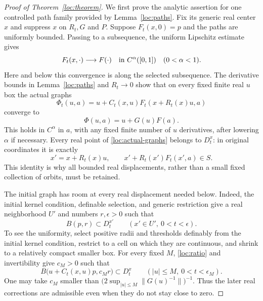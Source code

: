 \begin{proof}[Proof of Theorem~\ref{loc:theorem}]
We first prove the analytic assertion for one controlled path family
provided by Lemma~\ref{loc:paths}.  Fix its generic real center $x$ and
suppress $x$ on $R_t,G$ and $P$.  Suppose
$F_t(x,0)=p$ and the paths are uniformly bounded.  Passing to a
subsequence, the uniform Lipschitz estimate gives
\[
                  F_t(x,\cdot)\longrightarrow F(\cdot)
                        \quad\hbox{in }C^\alpha([0,1])
                        \quad(0<\alpha<1).
\]
Here and below this convergence is along the selected subsequence.
The derivative bounds in Lemma~\ref{loc:paths} and $R_t\to0$ show that
on every fixed finite real $u$ box the actual graphs
\begin{equation}\label{loc:actual-graphs}
 \Phi_t(u,a)=u+C_t(x,u)F_t(x+R_t(x)u,a)
\end{equation}
converge to
\begin{equation}\label{loc:limit-graphs}
                       \Phi(u,a)=u+G(u)F(a).
\end{equation}
This holds in $C^\alpha$ in $a$, with any fixed finite number of
$u$ derivatives, after lowering $\alpha$ if necessary.  Every real
point of \eqref{loc:actual-graphs} belongs to $D_t^x$: in original
coordinates it is exactly
\[
 x'=x+R_t(x)u,\qquad x'+R_t(x')F_t(x',a)\in S.
\]
This identity is why all bounded real displacements, rather than a
small fixed collection of orbits, must be retained.

The initial graph has room at every real displacement needed below.
Indeed, the initial kernel condition, definable selection, and generic
restriction give a real neighborhood $U'$ and numbers $r,\epsilon>0$
such that
\begin{equation}\label{loc:uniform-start}
 B(p,r)\subset D_t^{x'}
       \qquad(x'\in U',\ 0<t<\epsilon).
\end{equation}
To see the uniformity, select positive radii and thresholds definably
from the initial kernel condition, restrict to a cell on which they
are continuous, and shrink to a relatively compact smaller box.
For every fixed $M$, \eqref{loc:ratio} and invertibility give $c_M>0$
such that
\begin{equation}\label{loc:orbit-room}
 B\bigl(u+C_t(x,u)p,c_Mr\bigr)\subset D_t^x
               \qquad(|u|\leq M,\ 0<t<\epsilon_M).
\end{equation}
One may take $c_M$ smaller than
$\bigl(2\sup_{|u|\leq M}\|G(u)^{-1}\|\bigr)^{-1}$.
Thus the later real corrections are admissible even when they do not
stay close to zero.


\end{proof}
